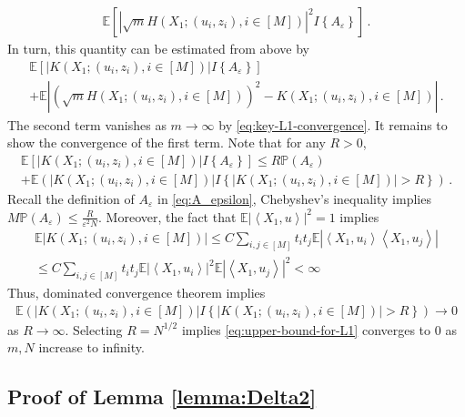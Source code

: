 \documentclass[12pt]{article}
\def\l{\left}
\def\r{\right}
\newcommand{\mb}{\mathbb}
\newcommand{\pr}[1]{\mathbb{P}{\left(#1\right)}}
\newcommand{\dotp}[2]{\left\langle#1,#2\right\rangle}
\theoremstyle{thmstyletwo}%
\theoremstyle{thmstylethree}%
\begin{document}
\begin{align*}
    \mb E \l[\l\lvert\sqrt{m} H(X_1; (u_i, z_i), i \in [M]) \r\rvert^2 I \l\{A_\varepsilon \r\}\r]\,.
\end{align*}
In turn, this quantity can be estimated from above by
\begin{multline*}
    \mb E \l[ \lvert K(X_1; (u_i, z_i), i \in [M]) \rvert I \l\{A_\varepsilon \r\}\r]\\
    + \mb E \l\lvert \l(\sqrt{m} H(X_1; (u_i, z_i), i \in [M]) \r)^2- K(X_1; (u_i, z_i), i \in [M]) \r\rvert\,.
\end{multline*}
The second term vanishes as $m \rightarrow \infty$ by \eqref{eq:key-L1-convergence}. It remains to show the convergence of the first term. Note that for any $R > 0$,
\begin{multline}\label{eq:upper-bound-for-L1}
    \mb E \l[\lvert K(X_1; (u_i, z_i), i \in [M]) \rvert I \l\{A_\varepsilon \r\}\r] \leq R \pr{A_\varepsilon} \\
    + \mb E \l(\lvert K(X_1; (u_i, z_i), i \in [M]) \rvert I\l\{\lvert K(X_1; (u_i, z_i), i \in [M]) \rvert > R\r\}\r)\,.
\end{multline}
Recall the definition of $A_\varepsilon$ in \eqref{eq:A_epsilon}, Chebyshev's inequality implies $M \pr{A_\varepsilon} \leq \frac{R}{\varepsilon^2 N}$. Moreover, the fact that $\mb E \l\lvert \dotp{X_1}{u}\r\rvert^2  = 1$ implies
\begin{multline*}
    \mb E \l\lvert K(X_1; (u_i, z_i), i \in [M]) \r\rvert \leq C\sum_{i, j \in [M]} t_i t_{j} \mb E\l\lvert \dotp{X_1}{u_i}\dotp{X_1}{u_j}\r\rvert \\
    \leq 
    C\sum_{i, j \in [M]} t_i t_{j} \mb E\l\lvert \dotp{X_1}{u_i}\r\rvert^2\mb E \l\lvert \dotp{X_1}{u_j}\r\rvert^2 < \infty
\end{multline*}
Thus, dominated convergence theorem implies
\begin{align*}
    \mb E \l(\lvert K(X_1; (u_i, z_i), i \in [M]) \rvert I\l\{\lvert K(X_1; (u_i, z_i), i \in [M]) \rvert > R\r\}\r) \rightarrow 0
\end{align*}
as $R \rightarrow \infty$. Selecting $R = N^{1/2}$ implies \eqref{eq:upper-bound-for-L1} converges to $0$ as $m,N$ increase to infinity.



\subsection{Proof of Lemma \ref{lemma:Delta2}}
\label{proof:Delta2}
\end{document}
